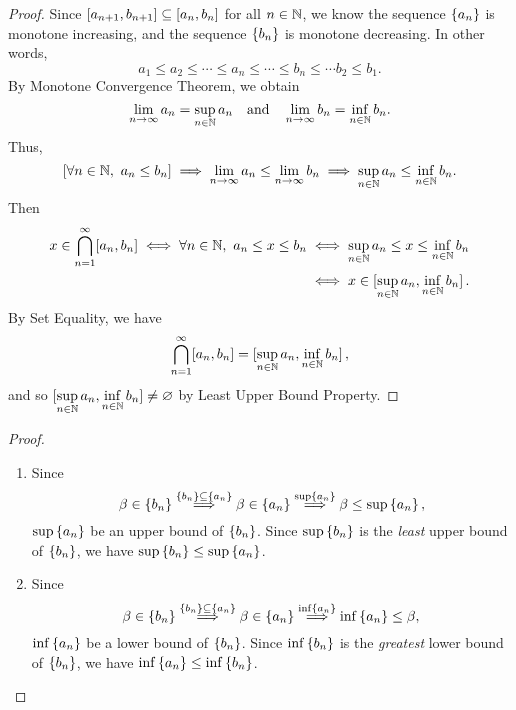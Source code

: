 \documentclass[11pt,openany]{article}
\begin{document}
\begin{proof}
	Since $\intcc{a_{n+1},b_{n+1}}\subseteq\intcc{a_n,b_n}$ for all $n\in\mathbb{N}$, we know  the sequence $\set{a_n}$ is monotone increasing, and the sequence $\set{b_n}$ is monotone decreasing. In other words, \[
	a_1\leq a_2\leq\cdots\leq a_n\leq \cdots\leq b_n\leq\cdots b_2\leq b_1.
	\] By Monotone Convergence Theorem, we obtain \[
	\lim\limits_{n\to\infty}a_n=\sup_{n\in\mathbb{N}} a_n\quad\text{and}\quad\lim\limits_{n\to\infty}b_n=\inf\limits_{n\in\mathbb{N}}b_n.
	\] 
	Thus, \[
	[\forall n\in\mathbb{N},\ a_n\leq b_n]\implies \lim\limits_{n\to\infty}a_n\leq\lim\limits_{n\to\infty}b_n\\
	\implies\sup\limits_{n\in\mathbb{N}} a_n\leq\inf\limits_{n\in\mathbb{N}} b_n.
	\]
Then \begin{align*}
x\in\bigcap_{n=1}^\infty[a_n,b_n]\iff \forall n\in\N,\ a_n\leq x\leq b_n
&\iff \sup\limits_{n\in\N} a_n\leq x\leq \inf\limits_{n\in\N} b_n\\
&\iff x\in\intcc[0]{\sup\limits_{n\in\N} a_n, \inf\limits_{n\in\N} b_n}.
\end{align*} By Set Equality, we have \[
\bigcap_{n=1}^\infty[a_n,b_n]=\intcc[0]{\sup\limits_{n\in\N} a_n, \inf\limits_{n\in\N} b_n},
\] and so $\intcc[0]{\sup\limits_{n\in\N} a_n, \inf\limits_{n\in\N} b_n}\neq\varnothing$ by Least Upper Bound Property.
\end{proof}

\newpage\noindent
{}
\begin{proof}
\begin{enumerate}[(1)]
	\item Since \[
	\beta\in \set{b_n}\overset{\set{b_n}\subseteq \set{a_n}}{\implies}\beta\in \set{a_n}\overset{\sup \set{a_n}}{\implies}\beta\leq \sup \set{a_n},
	\] $\sup \set{a_n}$ be an upper bound of $\set{b_n}$. Since $\sup \set{b_n}$ is the \textit{least} upper bound of $\set{b_n}$, we have $\sup \set{b_n}\leq\sup \set{a_n}$.
	\item Since \[
	\beta\in \set{b_n}\overset{\set{b_n}\subseteq \set{a_n}}{\implies}\beta\in \set{a_n}\overset{\inf \set{a_n}}{\implies}\inf \set{a_n}\leq \beta,
	\] $\inf \set{a_n}$ be a lower bound of $\set{b_n}$. Since $\inf \set{b_n}$ is the \textit{greatest} lower bound of $\set{b_n}$, we have $\inf \set{a_n}\leq\inf \set{b_n}$.
\end{enumerate}
\end{proof}
\end{document}

